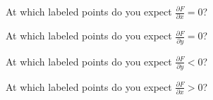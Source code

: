 \documentclass{ximera}
\begin{document}
\begin{exercise}
At which labeled points do you expect $\frac{\partial F}{\partial x} = 0$?
\begin{selectAll}
\end{selectAll}
\end{exercise}


\begin{exercise}
At which labeled points do you expect $\frac{\partial F}{\partial y} = 0$?
\begin{selectAll}
\end{selectAll}
\end{exercise}



\begin{exercise}
At which labeled points do you expect $\frac{\partial F}{\partial y} < 0$?
\begin{selectAll}
\end{selectAll}
\end{exercise}


\begin{exercise}
At which labeled points do you expect $\frac{\partial F}{\partial x} > 0$?
\begin{selectAll}
\end{selectAll}
\end{exercise}
\end{document}
